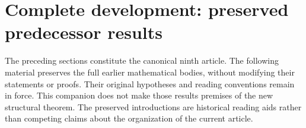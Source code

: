 \newif\ifcomplete\completetrue


\clearpage
\section*{Complete development: preserved predecessor results}
The preceding sections constitute the canonical ninth article.
The following material preserves the full earlier mathematical bodies,
without modifying their statements or proofs. Their original hypotheses
and reading conventions remain in force. This companion does not make
those results premises of the new structural theorem. The preserved
introductions are historical reading aids rather than competing claims
about the organization of the current article.





















